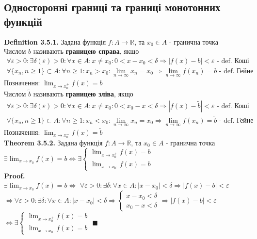 \documentclass[a4paper, 14pt]{extarticle}
\def\huge{\displaystyle}
\def\bigline{\vspace{5mm}\\}
\def\defin#1{\textbf{Definition {#1}}}
\def\th#1{\textbf{Theorem {#1}}}
\def\proof{\textbf{Proof.}\\}
\def\bigline{\vspace{5mm}\\}
\def\qed{$\blacksquare$}
\begin{document}
\subsection{Односторонні границі та границі монотонних функцій}
\defin{3.5.1.} Задана функція $f: A \to \mathbb{R}$, та $x_0 \in A$ - гранична точка\\
Числом $b$ називають \textbf{границею справа}, якщо
\begin{align*}
\forall \varepsilon > 0: \exists \delta(\varepsilon)>0: \forall x \in A: x \neq x_0: 0<x-x_0<\delta \Rightarrow |f(x)-b|<\varepsilon \textrm{ - def. Коші}\\
\forall \{x_n,n\geq 1\} \subset A: \forall n \geq 1: x_n > x_0: \lim_{n \to \infty}x_n = x_0 \Rightarrow \lim_{n \to \infty}f(x_n) = b \textrm{ - def. Гейне}
\end{align*}
Позначення: $\huge \lim_{x \to x_0^+} f(x) = b$\\
Числом $\tilde{b}$ називають \textbf{границею зліва}, якщо
\begin{align*}
\forall \varepsilon > 0: \exists \delta(\varepsilon)>0: \forall x \in A: x \neq x_0: 0<x_0-x<\delta \Rightarrow |f(x)-\tilde{b}|<\varepsilon \textrm{ - def. Коші}\\
\forall \{x_n,n\geq 1\} \subset A: \forall n \geq 1: x_n < x_0: \lim_{n \to \infty}x_n = x_0 \Rightarrow \lim_{n \to \infty}f(x_n) = \tilde{b} \textrm{ - def. Гейне}
\end{align*}
Позначення: $\huge \lim_{x \to x_0^-} f(x) = \tilde{b}$
\bigline
\th{3.5.2.} Задана функція $f: A \to \mathbb{R}$, та $x_0 \in A$ - гранична точка\\
$\exists \huge \lim_{x \to x_0} f(x) = b \iff \exists \begin{cases} \huge \lim_{x \to x_0^+} f(x) = b \\ \huge \lim_{x \to x_0^-} f(x) = b \end{cases}$\\
\proof
$\exists \huge \lim_{x \to x_0} f(x) = b \iff$
$\forall \varepsilon > 0: \exists \delta: \forall x \in A: |x-x_0|<\delta \Rightarrow |f(x)-b|<\varepsilon$\\
$\iff \forall \varepsilon > 0: \exists \delta: \forall x \in A: |x-x_0|<\delta \Rightarrow \begin{cases} x-x_0<\delta \\ x_0-x<\delta \end{cases} \Rightarrow |f(x)-b|<\varepsilon$ \\ $\iff \exists \begin{cases} \huge \lim_{x \to x_0^+} f(x) = b \\ \huge \lim_{x \to x_0^-} f(x) = b \end{cases}$ \qed \bigline
\end{document}
